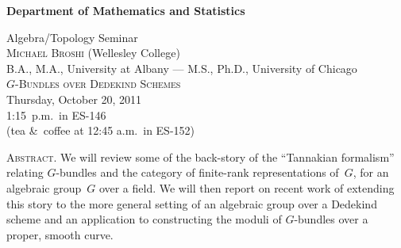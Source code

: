 \documentclass[12pt]{article}
\begin{document}
\noindent\hspace{-28px}%
\hfill\textsf{\textbf{\footnotesize%
Department of Mathematics and Statistics}}\bigskip\bigskip

\begin{center}\Large
  \textsf{{\huge Algebra/Topology Seminar}}\\[2.5\bigskipamount]
  \textsc{Michael Broshi} {\large(Wellesley College)}\\
  {\large B.A., M.A., University at Albany --- M.S., Ph.D., University of Chicago}\\[\bigskipamount]
  \textsc{$G$-Bundles over Dedekind Schemes}\\[2\bigskipamount]
  Thursday, October 20, 2011\\ 1:15~p.m.\ in ES-146\\
  (tea \&\ coffee at 12:45 a.m.\ in ES-152)
\end{center}\bigskip\bigskip

\large\noindent\textsc{Abstract.}
We will review some of the back-story of the ``Tannakian formalism'' relating $G$-bundles and the category of finite-rank representations of~$G$, for an algebraic group~$G$ over a field.  We will then report on recent work of extending this story to the more general setting of an algebraic group over a Dedekind scheme and an application to constructing the moduli of $G$-bundles over a proper, smooth curve.
\end{document}
